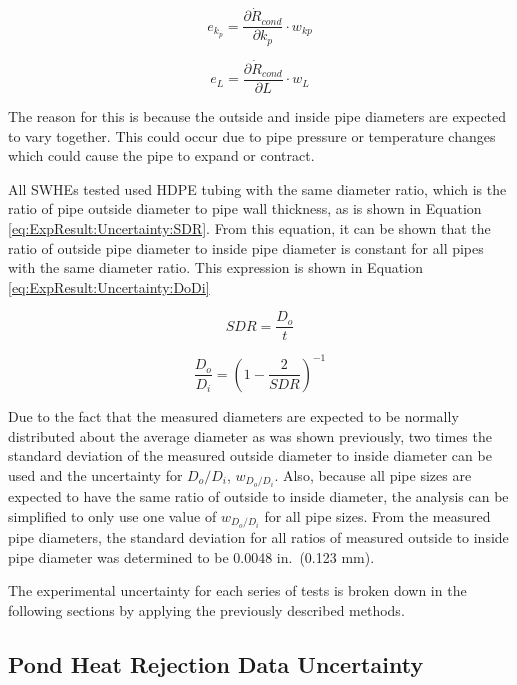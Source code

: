 	\begin{equation*}
	e_{k_p} = \frac{\partial \dot{R}_{cond}}{\partial k_p} \cdot w_{kp}
	\end{equation*}

	\begin{equation*}
	e_{L} = \frac{\partial\dot{R}_{cond}}{\partial L} \cdot w_{L}
	\end{equation*}
	
The reason for this is because the outside and inside pipe diameters are expected to vary together. This could occur due to pipe pressure or temperature changes which could cause the pipe to expand or contract. 

 All SWHEs tested used HDPE tubing with the same diameter ratio, which is the ratio of pipe outside diameter to pipe wall thickness, as is shown in Equation \ref{eq:ExpResult:Uncertainty:SDR}. From this equation, it can be shown that the ratio of outside pipe diameter to inside pipe diameter is constant for all pipes with the same diameter ratio. This expression is shown in Equation \ref{eq:ExpResult:Uncertainty:DoDi}

\begin{equation}
	SDR = \frac{D_o}{t}
	\label{eq:ExpResult:Uncertainty:SDR}
\end{equation}

\begin{equation}
	\frac{D_o}{D_i} = \left(1 - \frac{2}{SDR} \right)^{-1}
	\label{eq:ExpResult:Uncertainty:DoDi}
\end{equation}

Due to the fact that the measured diameters are expected to be normally distributed about the average diameter as was shown previously, two times the standard deviation of the measured outside diameter to inside diameter can be used and the uncertainty for $D_o/D_i$, $w_{D_o/D_i}$. Also, because all pipe sizes are expected to have the same ratio of outside to inside diameter, the analysis can be simplified to only use one value of $w_{D_o/D_i}$ for all pipe sizes. From the measured pipe diameters, the standard deviation for all ratios of measured outside to inside pipe diameter was determined to be 0.0048 in.\ (0.123 mm).

The experimental uncertainty for each series of tests is broken down in the following sections by applying the previously described methods.

\subsection{Pond Heat Rejection Data Uncertainty}
\label{subsec:ExpResult:Uncertainty:PondRej}

